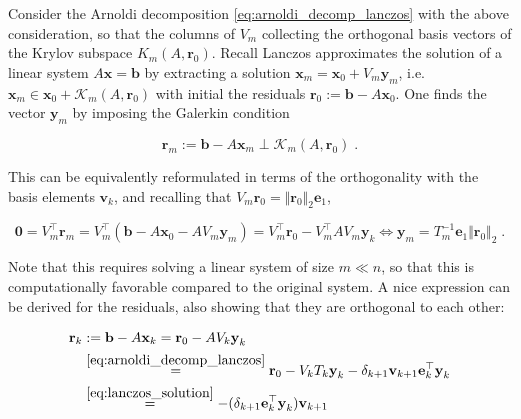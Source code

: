 \documentclass{article}
\newcommand{\vect}[1]{\boldsymbol{\mathbf{#1}}}
\newcommand{\R}{\mathbb R}
\newcommand{\norm}[1]{\Vert #1 \Vert}
\begin{document}


Consider the Arnoldi decomposition \eqref{eq:arnoldi_decomp_lanczos} with the above consideration, so that the columns of $V_m$ collecting the orthogonal basis vectors of the Krylov subspace $K_m(A, \vect r_0)$. Recall Lanczos approximates the solution of a linear system $A\vect x = \vect b$ by extracting a solution $\vect x_m = \vect x_0 + V_m \vect y_m$, i.e. $\vect x_m \in \vect x_0 + \mathcal K_m(A, \vect r_0)$ with initial the residuals $\vect r_0 := \vect b - A \vect x_0$. One finds the vector $\vect y_m$ by imposing the Galerkin condition 

\begin{equation}
    \vect r_m := \vect b - A \vect x_m \perp \mathcal K_m(A, \vect r_0) \; .
\end{equation}

This can be equivalently reformulated in terms of the orthogonality with the basis elements $\vect v_k$, and recalling that $V_m \vect r_0 = \Vert \vect r_0 \Vert_2 \vect e_1$,

\begin{equation} \label{eq:lanczos_solution}
    \vect 0 = V_m^\top \vect r_m = V_m^\top (\vect b - A \vect x_0 - A V_m \vect y_m) = V_m^\top \vect r_0 - V_m^\top A V_m \vect y_k 
    \iff \vect y_m = T_m^{-1} \vect e_1 \norm{\vect r_0}_2 \; .
\end{equation}

Note that this requires solving a linear system of size $m \ll n$, so that this is computationally favorable compared to the original system. A nice expression can be derived for the residuals, also showing that they are orthogonal to each other:

\begin{align}
    \vect r_k &:= \vect b - A \vect x_k = \vect r_0 - A V_k \vect y_k\\
    &\stackrel{\eqref{eq:arnoldi_decomp_lanczos}}{=} \vect r_0 - V_k T_k \vect y_k - \delta_{k+1} \vect v_{k+1} \vect e_k^\top \vect y_k\\
    &\stackrel{\eqref{eq:lanczos_solution}}{=} -(\delta_{k+1} \vect e_k^\top \vect y_k) \vect v_{k+1} \label{eq:lanczos_residuals_basis_vec}
\end{align}
\end{document}
